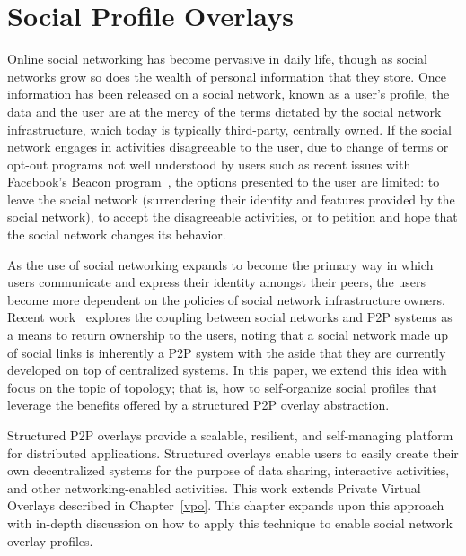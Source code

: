 \chapter{Social Profile Overlays}
\label{spo}
Online social networking has become pervasive in daily life, though as social
networks grow so does the wealth of personal information that they store.  Once
information has been released on a social network, known as a user's profile,
the data and the user are at the mercy of the terms dictated by the social
network infrastructure, which today is typically third-party, centrally owned.
If the social network engages in activities disagreeable to the user, due to
change of terms or opt-out programs not well understood by users such as recent
issues with Facebook's Beacon program~\cite{facebook_beacon}, the options
presented to the user are limited: to leave the social network (surrendering
their identity and features provided by the social network), to accept the
disagreeable activities, or to petition and hope that the social network
changes its behavior. 

As the use of social networking expands to become the primary way in which users
communicate and express their identity amongst their peers, the users become
more dependent on the policies of social network infrastructure owners.  Recent
work~\cite{p2p_socialnetwork} explores the coupling between social networks and
P2P systems as a means to return ownership to the users, noting that a social
network made up of social links is inherently a P2P system with the aside that
they are currently developed on top of centralized systems.  In this paper, we
extend this idea with focus on the topic of topology; that is, how to
self-organize social profiles that leverage the benefits offered by a
structured P2P overlay abstraction.

Structured P2P overlays provide a scalable, resilient, and self-managing
platform for distributed applications.  Structured overlays enable users to
easily create their own decentralized systems for the purpose of data sharing,
interactive activities, and other networking-enabled activities.  This work
extends Private Virtual Overlays described in Chapter~\ref{vpo}.  This chapter
expands upon this approach with in-depth discussion on how to apply this
technique to enable social network overlay profiles.

